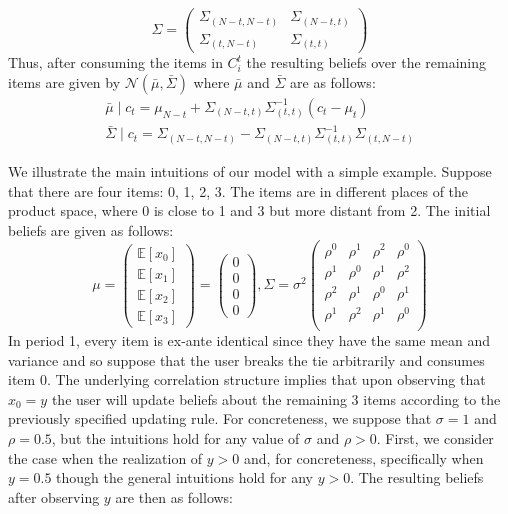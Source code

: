\documentclass[manuscript]{acmart}
\newcommand{\xhdr}[1]{\vspace{1mm} \noindent{\bf #1}}
\begin{document}
\[ \Sigma =  \left( \begin{array}{cc}
\Sigma_{(N-t, N-t)} & \Sigma_{(N-t,t)} \\
\Sigma_{(t,N-t)} & \Sigma_{(t,t)}
\end{array} \right)
\]
Thus, after consuming the items in $C_{i}^{t}$ the resulting beliefs over the remaining items are given by $\mathcal{N}(\bar{\mu}, \bar{\Sigma})$ where $\bar{\mu}$ and $\bar{\Sigma}$ are as follows:
\begin{align*}
\bar{\mu} \mid c_t = \mu_{N-t} + \Sigma_{(N-t,t)} \Sigma_{(t,t)}^{-1}(c_t - \mu_t) \\
\bar{\Sigma} \mid c_t = \Sigma_{(N-t,N-t)} - \Sigma_{(N-t,t)} \Sigma_{(t,t)}^{-1} \Sigma_{(t,N-t)}
\end{align*}

\xhdr{An Illustrative Example} We illustrate the main intuitions of our model with a simple example. Suppose that there are four items: 0, 1, 2, 3. The items are in different places of the product space, where 0 is close to 1 and 3 but more distant from 2. The initial beliefs are given as follows:
\[ \mu = \left (\begin{array}{c}
\mathbb{E}[x_0] \\
\mathbb{E}[x_1] \\
\mathbb{E}[x_2] \\
\mathbb{E}[x_3]
\end{array}  \right) = \left (\begin{array}{c}
0 \\
0\\
0 \\
0
\end{array}  \right), \Sigma =  \sigma^{2} \left( \begin{array}{cccc}
\rho^{0} & \rho^{1} & \rho^{2} & \rho^{0} \\
\rho^{1} & \rho^{0} & \rho^{1} & \rho^{2} \\
\rho^{2} & \rho^{1} & \rho^{0} & \rho^{1} \\
\rho^{1} & \rho^{2} & \rho^{1} & \rho^{0} \\
\end{array} \right)
\]
In period 1, every item is ex-ante identical since they have the same mean and variance and so suppose that the user breaks the tie arbitrarily and consumes item 0. The underlying correlation structure implies that upon observing that $x_0=y$ the user will update beliefs about the remaining 3 items according to the previously specified updating rule. For concreteness, we suppose that $\sigma = 1$ and $\rho = 0.5$, but the intuitions hold for any value of $\sigma$ and $\rho > 0$. First, we consider the case when the realization of $y > 0$ and, for concreteness, specifically when $y = 0.5$ though the general intuitions hold for any $y > 0$. The resulting beliefs after observing $y$ are then as follows:
\end{document}
